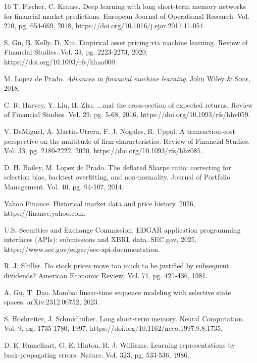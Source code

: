 \documentclass[12pt]{article}
\begin{document}
\begin{thebibliography}{16}
 T. Fischer, C. Krauss. Deep learning with long short-term memory networks for financial market predictions. European Journal of Operational Research. Vol. 270, pg. 654-669, 2018, https://doi.org/10.1016/j.ejor.2017.11.054.

 S. Gu, B. Kelly, D. Xiu. Empirical asset pricing via machine learning. Review of Financial Studies. Vol. 33, pg. 2223-2273, 2020, https://doi.org/10.1093/rfs/hhaa009.

 M. Lopez de Prado. \textit{Advances in financial machine learning}. John Wiley \& Sons, 2018.

 C. R. Harvey, Y. Liu, H. Zhu. ...and the cross-section of expected returns. Review of Financial Studies. Vol. 29, pg. 5-68, 2016, https://doi.org/10.1093/rfs/hhv059.

 V. DeMiguel, A. Martin-Utrera, F. J. Nogales, R. Uppal. A transaction-cost perspective on the multitude of firm characteristics. Review of Financial Studies. Vol. 33, pg. 2180-2222, 2020, https://doi.org/10.1093/rfs/hhz085.

 D. H. Bailey, M. Lopez de Prado. The deflated Sharpe ratio: correcting for selection bias, backtest overfitting, and non-normality. Journal of Portfolio Management. Vol. 40, pg. 94-107, 2014.

 Yahoo Finance. Historical market data and price history. 2026, https://finance.yahoo.com.

 U.S. Securities and Exchange Commission. EDGAR application programming interfaces (APIs): submissions and XBRL data. SEC.gov, 2025, https://www.sec.gov/edgar/sec-api-documentation.

 R. J. Shiller. Do stock prices move too much to be justified by subsequent dividends? American Economic Review. Vol. 71, pg. 421-436, 1981.

 A. Gu, T. Dao. Mamba: linear-time sequence modeling with selective state spaces. arXiv:2312.00752, 2023.

 S. Hochreiter, J. Schmidhuber. Long short-term memory. Neural Computation. Vol. 9, pg. 1735-1780, 1997, https://doi.org/10.1162/neco.1997.9.8.1735.

 D. E. Rumelhart, G. E. Hinton, R. J. Williams. Learning representations by back-propagating errors. Nature. Vol. 323, pg. 533-536, 1986.


\end{thebibliography}
\end{document}
